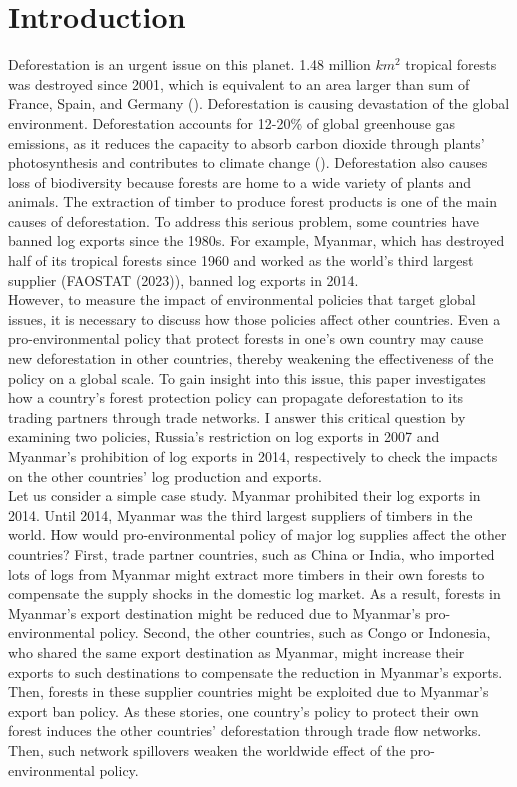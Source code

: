 \documentclass[a4paper,12pt]{article}
\begin{document}
\section{Introduction}
Deforestation is an urgent issue on this planet. 1.48 million $km^2$ tropical forests was destroyed since 2001, which is equivalent to an area larger than sum of France, Spain, and Germany (\cite{balboni2023economics}). Deforestation is causing devastation of the global environment. Deforestation accounts for 12-20\% of global greenhouse gas emissions, as it reduces the capacity to absorb carbon dioxide through plants' photosynthesis and contributes to climate change (\cite{van2009co2}). Deforestation also causes loss of biodiversity because forests are home to a wide variety of plants and animals. The extraction of timber to produce forest products is one of the main causes of deforestation. To address this serious problem, some countries have banned log exports since the 1980s. For example, Myanmar, which has destroyed half of its tropical forests since 1960 and worked as the world's third largest supplier (FAOSTAT (2023)), banned log exports in 2014. \\

However, to measure the impact of environmental policies that target global issues, it is necessary to discuss how those policies affect other countries. Even a pro-environmental policy that protect forests in one's own country may cause new deforestation in other countries, thereby weakening the effectiveness of the policy on a global scale. To gain insight into this issue, this paper investigates how a country's forest protection policy can propagate deforestation to its trading partners through trade networks. I answer this critical question by examining two policies, Russia's restriction on log exports in 2007 and Myanmar's prohibition of log exports in 2014, respectively to check the impacts on the other countries' log production and exports.\\

Let us consider a simple case study. Myanmar prohibited their log exports in 2014. Until 2014, Myanmar was the third largest suppliers of timbers in the world. How would pro-environmental policy of major log supplies affect the other countries? First, trade partner countries, such as China or India, who imported lots of logs from Myanmar might extract more timbers in their own forests to compensate the supply shocks in the domestic log market. As a result, forests in Myanmar's export destination might be reduced due to Myanmar's pro-environmental policy. Second, the other countries, such as Congo or Indonesia, who shared the same export destination as Myanmar, might increase their exports to such destinations to compensate the reduction in Myanmar's exports. Then, forests in these supplier countries might be exploited due to Myanmar's export ban policy. As these stories, one country's policy to protect their own forest induces the other countries' deforestation through trade flow networks. Then, such network spillovers weaken the worldwide effect of the pro-environmental policy.\\
\end{document}
